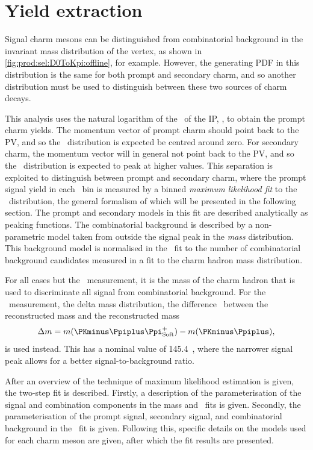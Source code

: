 \chapter{Yield extraction}
\label{chap:prod:fitting}

Signal charm mesons can be distinguished from combinatorial background in the 
invariant mass distribution of the vertex, as shown in 
\cref{fig:prod:sel:D0ToKpi:offline}, for example.
However, the generating \acf{PDF} in this distribution is the same for both 
prompt and secondary charm, and so another distribution must be used to 
distinguish between these two sources of charm decays.

This analysis uses the natural logarithm of the \chisq\ of the \acf{IP}, 
\lnipchisq, to obtain the prompt charm yields.
The momentum vector of prompt charm should point back to the \acf{PV}, and so 
the \lnipchisq\ distribution is expected be centred around zero.
For secondary charm, the momentum vector will in general not point back to the 
\ac{PV}, and so the \lnipchisq\ distribution is expected to peak at higher 
values.
This separation is exploited to distinguish between prompt and secondary charm, 
where the prompt signal yield in each \pTy\ bin is measured by a binned 
\emph{maximum likelihood fit} to the \lnipchisq\ distribution, the general 
formalism of which will be presented in the following section.
The prompt and secondary models in this fit are described analytically as 
peaking functions.
The combinatorial background is described by a non-parametric model taken from 
outside the signal peak in the \emph{mass} distribution.
This background model is normalised in the \lnipchisq\ fit to the number of 
combinatorial background candidates measured in a fit to the charm hadron mass 
distribution.

For all cases but the \PDstarp\ measurement, it is the mass of the charm hadron 
that is used to discriminate all signal from combinatorial background.
For the \PDstarp\ measurement, the delta mass distribution, the difference 
\deltam\ between the reconstructed \PDstarp mass and the reconstructed \PDzero 
mass
\begin{equation}
  \deltam = m(\PKminus\Ppiplus\Ppiplussoft) - m(\PKminus\Ppiplus),
\end{equation}
is used instead.
This has a nominal value of \SI{145.4}{\MeVcc}~\cite{PDG2014}, where the 
narrower signal peak allows for a better signal-to-background ratio.

After an overview of the technique of maximum likelihood estimation is given, 
the two-step fit is described.
Firstly, a description of the parameterisation of the signal and combination 
components in the mass and \deltam\ fits is given.
Secondly, the parameterisation of the prompt signal, secondary signal, and 
combinatorial background in the \lnipchisq\ fit is given.
Following this, specific details on the models used for each charm meson are 
given, after which the fit results are presented.

